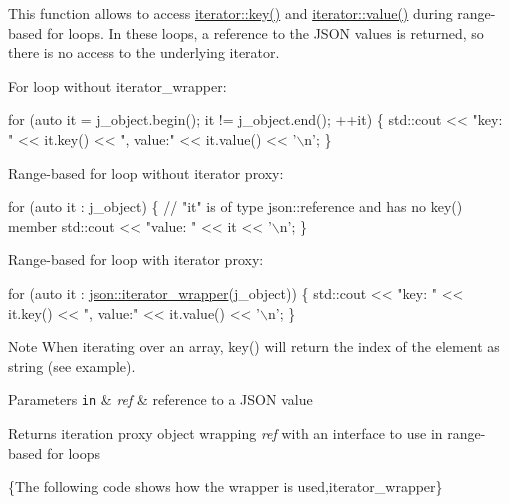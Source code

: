 This function allows to access \mbox{\hyperlink{classnlohmann_1_1detail_1_1iter__impl_a15dfb2744fed2ef40c12a9e9a20d6dbc}{iterator\+::key()}} and \mbox{\hyperlink{classnlohmann_1_1detail_1_1iter__impl_ab447c50354c6611fa2ae0100ac17845c}{iterator\+::value()}} during range-\/based for loops. In these loops, a reference to the J\+S\+ON values is returned, so there is no access to the underlying iterator.

For loop without iterator\+\_\+wrapper\+:


\begin{DoxyCode}
\textcolor{keywordflow}{for} (\textcolor{keyword}{auto} it = j\_object.begin(); it != j\_object.end(); ++it)
\{
    std::cout << \textcolor{stringliteral}{"key: "} << it.key() << \textcolor{stringliteral}{", value:"} << it.value() << \textcolor{charliteral}{'\(\backslash\)n'};
\}
\end{DoxyCode}


Range-\/based for loop without iterator proxy\+:


\begin{DoxyCode}
\textcolor{keywordflow}{for} (\textcolor{keyword}{auto} it : j\_object)
\{
    \textcolor{comment}{// "it" is of type json::reference and has no key() member}
    std::cout << \textcolor{stringliteral}{"value: "} << it << \textcolor{charliteral}{'\(\backslash\)n'};
\}
\end{DoxyCode}


Range-\/based for loop with iterator proxy\+:


\begin{DoxyCode}
\textcolor{keywordflow}{for} (\textcolor{keyword}{auto} it : \mbox{\hyperlink{classnlohmann_1_1basic__json_a5e4212986136ca1220f351c60e89906b}{json::iterator\_wrapper}}(j\_object))
\{
    std::cout << \textcolor{stringliteral}{"key: "} << it.key() << \textcolor{stringliteral}{", value:"} << it.value() << \textcolor{charliteral}{'\(\backslash\)n'};
\}
\end{DoxyCode}


\begin{DoxyNote}{Note}
When iterating over an array, {\ttfamily key()} will return the index of the element as string (see example).
\end{DoxyNote}

\begin{DoxyParams}[1]{Parameters}
\mbox{\tt in}  & {\em ref} & reference to a J\+S\+ON value \\
\hline
\end{DoxyParams}
\begin{DoxyReturn}{Returns}
iteration proxy object wrapping {\itshape ref} with an interface to use in range-\/based for loops
\end{DoxyReturn}
\{The following code shows how the wrapper is used,iterator\+\_\+wrapper\}

